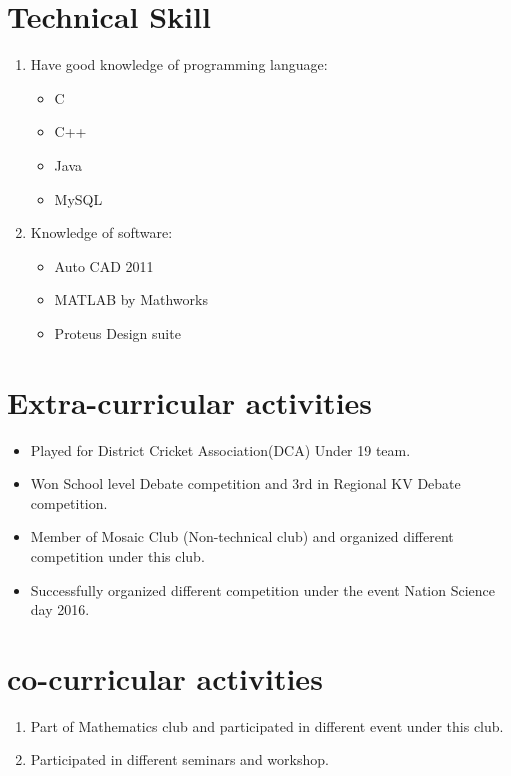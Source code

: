 \documentclass[11pt,a4paper]{article}
\begin{document}
\section*{Technical Skill}
\vspace{-0.7em}\hline \vspace{1.5em}
\begin{enumerate}
\item Have good knowledge of programming language:
\begin{itemize}
\item C
\item C++
\item Java
\item MySQL
\end{itemize}
\item Knowledge of software:
\begin{itemize}
\item Auto CAD 2011
\item MATLAB by Mathworks
\item Proteus Design suite
\end{itemize}
\end{enumerate}

\section*{Extra-curricular activities}
\vspace{-0.7em}\hline \vspace{1.5em}
\begin{itemize}
\item Played for District Cricket Association(DCA) Under 19 team.
\item Won School level Debate competition and 3rd in Regional KV Debate competition.
\item Member of Mosaic Club (Non-technical club) and organized different competition under this club.
\item Successfully organized different competition under the event Nation Science day 2016.
\end{itemize}
\section*{co-curricular activities}
\vspace{-0.7em}\hline \vspace{1.5em}
\begin{enumerate}
\item Part of Mathematics club and participated in different event under this club.
\item Participated in different seminars and workshop.

\end{enumerate}
\end{document}
